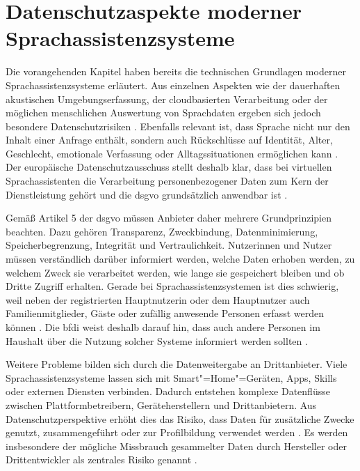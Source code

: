 \section{Datenschutzaspekte moderner Sprachassistenzsysteme}
\label{sec:Datenschutzaspekte_moderner_Sprachassistenzsysteme}
Die vorangehenden Kapitel haben bereits die technischen Grundlagen moderner Sprachassistenzsysteme erläutert. Aus einzelnen Aspekten wie der dauerhaften akustischen Umgebungserfassung, der cloudbasierten Verarbeitung oder der möglichen menschlichen Auswertung von Sprachdaten ergeben sich jedoch besondere Datenschutzrisiken \autocite{voiceassistantIntroduction}. Ebenfalls relevant ist, dass Sprache nicht nur den Inhalt einer Anfrage enthält, sondern auch Rückschlüsse auf Identität, Alter, Geschlecht, emotionale Verfassung oder Alltagssituationen ermöglichen kann \autocite{EDPBLeitlinienSprachassistenzsysteme}. Der europäische Datenschutzausschuss stellt deshalb klar, dass bei virtuellen Sprachassistenten die Verarbeitung personenbezogener Daten zum Kern der Dienstleistung gehört und die \gls{dsgvo} grundsätzlich anwendbar ist \autocite{EDPBLeitlinienSprachassistenzsysteme}.

Gemäß Artikel 5 der \gls{dsgvo} müssen Anbieter daher mehrere Grundprinzipien beachten. Dazu gehören Transparenz, Zweckbindung, Datenminimierung, Speicherbegrenzung, Integrität und Vertraulichkeit. Nutzerinnen und Nutzer müssen verständlich darüber informiert werden, welche Daten erhoben werden, zu welchem Zweck sie verarbeitet werden, wie lange sie gespeichert bleiben und ob Dritte Zugriff erhalten. Gerade bei Sprachassistenzsystemen ist dies schwierig, weil neben der registrierten Hauptnutzerin oder dem Hauptnutzer auch Familienmitglieder, Gäste oder zufällig anwesende Personen erfasst werden können \autocite{EDPBLeitlinienSprachassistenzsysteme}. Die \gls{bfdi} weist deshalb darauf hin, dass auch andere Personen im Haushalt über die Nutzung solcher Systeme informiert werden sollten \autocite{BfDISprachassistenzsysteme}.

Weitere Probleme bilden sich durch die Datenweitergabe an Drittanbieter. Viele Sprachassistenzsysteme lassen sich mit Smart"=Home"=Geräten, Apps, Skills oder externen Diensten verbinden. Dadurch entstehen komplexe Datenflüsse zwischen Plattformbetreibern, Geräteherstellern und Drittanbietern. Aus Datenschutzperspektive erhöht dies das Risiko, dass Daten für zusätzliche Zwecke genutzt, zusammengeführt oder zur Profilbildung verwendet werden \autocite{EDPBLeitlinienSprachassistenzsysteme}. Es werden insbesondere der mögliche Missbrauch gesammelter Daten durch Hersteller oder Drittentwickler als zentrales Risiko genannt \autocite{EDPBLeitlinienSprachassistenzsysteme,voiceassistantIntroduction}.

